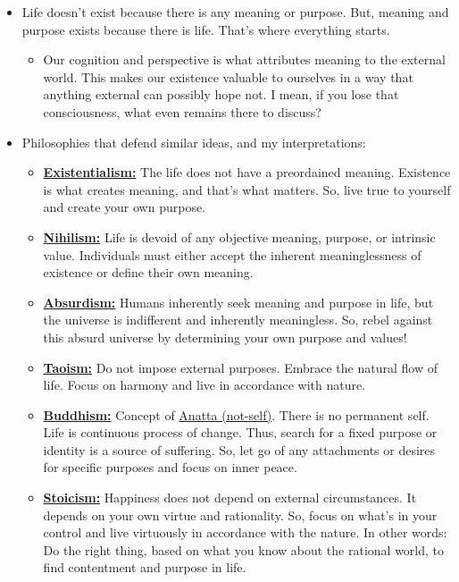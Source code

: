 \documentclass[
]{book}
\providecommand{\tightlist}{%
  \setlength{\itemsep}{0pt}\setlength{\parskip}{0pt}}
\begin{document}
\begin{itemize}
\item
  Life doesn't exist because there is any meaning or purpose. But, meaning and purpose exists because there is life. That's where everything starts.

  \begin{itemize}
  \tightlist
  \item
    Our cognition and perspective is what attributes meaning to the external world. This makes our existence valuable to ourselves in a way that anything external can possibly hope not. I mean, if you lose that consciousness, what even remains there to discuss?
  \end{itemize}
\item
  Philosophies that defend similar ideas, and my interpretations:

  \begin{itemize}
  \tightlist
  \item
    \href{https://en.wikipedia.org/wiki/Existentialism}{\textbf{Existentialism:}} The life does not have a preordained meaning. Existence is what creates meaning, and that's what matters. So, live true to yourself and create your own purpose.
  \item
    \href{https://en.wikipedia.org/wiki/Nihilism}{\textbf{Nihilism:}} Life is devoid of any objective meaning, purpose, or intrinsic value. Individuals must either accept the inherent meaninglessness of existence or define their own meaning.
  \item
    \href{https://en.wikipedia.org/wiki/Absurdism}{\textbf{Absurdism:}} Humans inherently seek meaning and purpose in life, but the universe is indifferent and inherently meaningless. So, rebel against this absurd universe by determining your own purpose and values!
  \item
    \href{https://en.wikipedia.org/wiki/Taoism}{\textbf{Taoism:}} Do not impose external purposes. Embrace the natural flow of life. Focus on harmony and live in accordance with nature.
  \item
    \href{https://en.wikipedia.org/wiki/Buddhist_philosophy}{\textbf{Buddhism:}} Concept of \href{https://en.wikipedia.org/wiki/Anatt\%C4\%81}{Anatta (not-self)}. There is no permanent self. Life is continuous process of change. Thus, search for a fixed purpose or identity is a source of suffering. So, let go of any attachments or desires for specific purposes and focus on inner peace.
  \item
    \href{https://en.wikipedia.org/wiki/Stoicism}{\textbf{Stoicism:}} Happiness does not depend on external circumstances. It depends on your own virtue and rationality. So, focus on what's in your control and live virtuously in accordance with the nature. In other words: Do the right thing, based on what you know about the rational world, to find contentment and purpose in life.
  \end{itemize}
\end{itemize}
\end{document}
